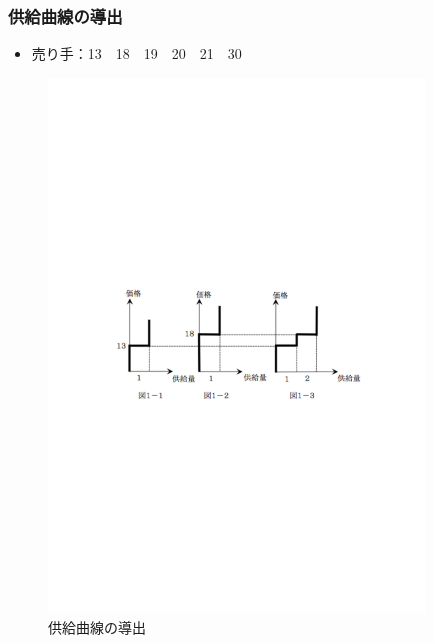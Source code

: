 \documentclass[dvipdfmx,12pt]{beamer}
\begin{document}
\begin{frame}
\frametitle{供給曲線の導出}
\begin{itemize}\setlength{\parskip}{0.5em}
\item
売り手：13　18　19　20　21　30
\end{itemize}
\begin{figure}
\centering
\includegraphics[width=100mm]{supply.pdf}
\caption{供給曲線の導出}
\label{fig:supply}
\end{figure}
\end{frame}
\end{document}
